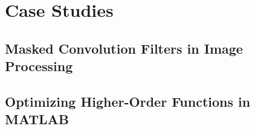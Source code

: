 \chapter{Case Studies}
\label{ch:case-studies}

\section{Masked Convolution Filters in Image Processing}

\section{Optimizing Higher-Order Functions in MATLAB}